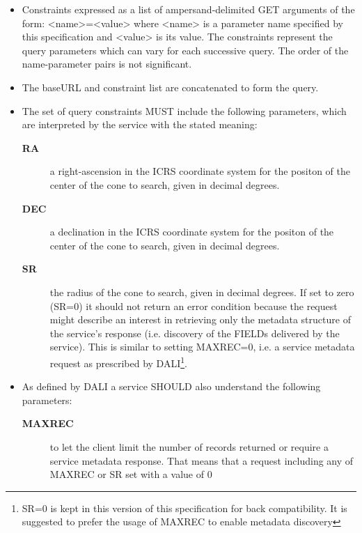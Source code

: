 \documentclass[11pt,a4paper]{ivoa}
\begin{document}
\begin{itemize}
		\item Constraints expressed as a list of
			ampersand-delimited GET arguments of the form: <name>=<value> where
			<name> is a parameter name specified by this specification and <value>
			is its value. The constraints represent the query parameters which can
			vary for each successive query. The order of the name-parameter pairs is
			not significant.
		\item The baseURL and constraint list are concatenated
			to form the query. 
		\item The set of query constraints MUST include the
			following parameters, which are interpreted by the service with the
			stated meaning: 
			\begin{description}
				\item[\textbf{RA}] a right-ascension
					in the ICRS coordinate system for the positon of the center of the cone
					to search, given in decimal degrees.
				\item[\textbf{DEC}] a declination
					in the ICRS coordinate system for the positon of the center of the cone
					to search, given in decimal degrees.
				\item[\textbf{SR}] the radius of the cone to search, given in decimal degrees.
					If set to zero (SR=0) it should not return an error condition because the
					request might describe an interest in retrieving only the metadata structure
					of the service's response (i.e. discovery of the FIELDs delivered by the service).
					This is similar to setting MAXREC=0, i.e. a service metadata request as prescribed
					by DALI\footnote{SR=0 is kept in this version of this specification for back
					compatibility. It is suggested to prefer the usage of MAXREC to enable metadata
					discovery}\citep{2017ivoa.spec.0517D}.
			\end{description}
		\item As defined by DALI a service SHOULD also understand the following parameters:
			\begin{description}
				\item[\textbf{MAXREC}] to let the client limit the number of records returned
					or require a service metadata response. That means that a
					request including any of MAXREC or SR set with a value of 0 

\end{description}
\end{itemize}
\end{document}
